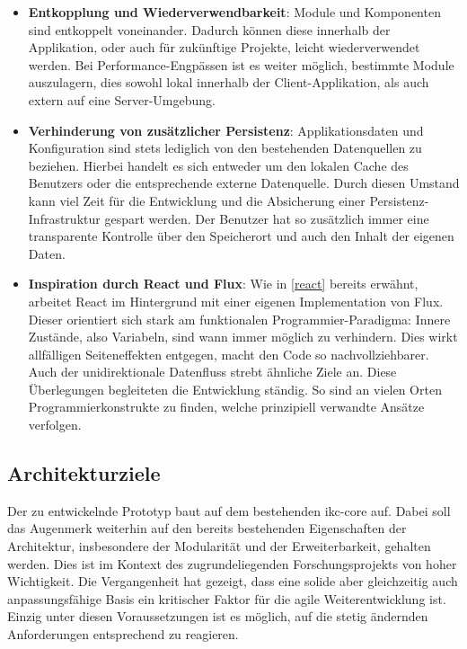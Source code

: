\begin{itemize}
    \item \textbf{Entkopplung und Wiederverwendbarkeit}:
    Module und Komponenten sind entkoppelt voneinander. Dadurch können diese innerhalb der Applikation, oder auch für zukünftige Projekte, leicht wiederverwendet werden. Bei Performance-Engpässen ist es weiter möglich, bestimmte Module auszulagern, dies sowohl lokal innerhalb der Client-Applikation, als auch extern auf eine Server-Umgebung.
    \item \textbf{Verhinderung von zusätzlicher Persistenz}:
    Applikationsdaten und Konfiguration sind stets lediglich von den bestehenden Datenquellen zu beziehen. Hierbei handelt es sich entweder um den lokalen Cache des Benutzers oder die entsprechende externe Datenquelle. Durch diesen Umstand kann viel Zeit für die Entwicklung und die Absicherung einer Per\-si\-stenz-In\-fra\-struk\-tur gespart werden. Der Benutzer hat so zusätzlich immer eine transparente Kontrolle über den Speicherort und auch den Inhalt der eigenen Daten.
    \item \textbf{Inspiration durch React und Flux}: Wie in \autoref{react} bereits erwähnt, arbeitet React im Hintergrund mit einer eigenen Implementation von Flux. Dieser orientiert sich stark am funktionalen Programmier-Paradigma: Innere Zustände, also Variabeln, sind wann immer möglich zu verhindern. Dies wirkt allfälligen Seiteneffekten entgegen, macht den Code so nachvollziehbarer. Auch der unidirektionale Datenfluss strebt ähn\-liche Ziele an. Diese Überlegungen begleiteten die Entwicklung ständig. So sind an vielen Orten Programmierkonstrukte zu finden, welche prinzipiell verwandte Ansätze verfolgen.
\end{itemize}



\subsection{Architekturziele}


Der zu entwickelnde Prototyp baut auf dem bestehenden \gls{ikc-core} auf. Dabei soll das Augenmerk weiterhin auf den bereits bestehenden Eigenschaften der Architektur, insbesondere der Modularität und der Erweiterbarkeit, gehalten werden. Dies ist im Kontext des zugrundeliegenden Forschungsprojekts von hoher Wichtigkeit. Die Vergangenheit hat gezeigt, dass eine solide aber gleichzeitig auch anpassungsfähige Basis ein kritischer Faktor für die agile Weiterentwicklung ist. Einzig unter diesen Voraussetzungen ist es möglich, auf die stetig ändernden Anforderungen entsprechend zu reagieren.

